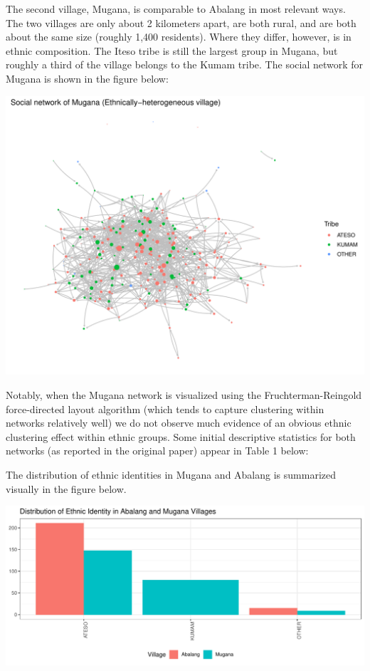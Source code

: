 \documentclass[]{article}
\begin{document}
The second village, Mugana, is comparable to Abalang in most relevant ways. The two villages are only about 2 kilometers apart, are both rural, and are both about the same size (roughly 1,400 residents). Where they differ, however, is in ethnic composition. The Iteso tribe is still the largest group in Mugana, but roughly a third of the village belongs to the Kumam tribe. The social network for Mugana is shown in the figure below:

\includegraphics{./figures/mugana_net.pdf}

Notably, when the Mugana network is visualized using the Fruchterman-Reingold force-directed layout algorithm (which tends to capture clustering within networks relatively well) we do not observe much evidence of an obvious ethnic clustering effect within ethnic groups. Some initial descriptive statistics for both networks (as reported in the original paper) appear in Table 1 below:



The distribution of ethnic identities in Mugana and Abalang is summarized visually in the figure below.

\includegraphics{./figures/ethnicity.pdf}
\end{document}
